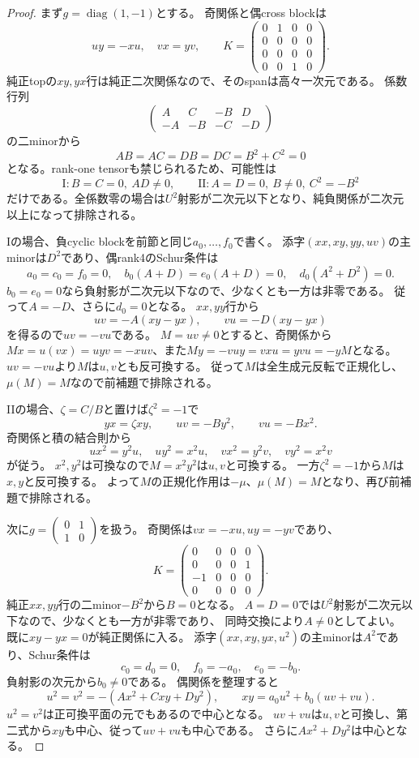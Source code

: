 \begin{proof}
まず$g=\operatorname{diag}(1,-1)$とする。
奇関係と偶cross blockは
\[
 uy=-xu,\quad vx=yv,\qquad
 K=\begin{pmatrix}0&1&0&0\\0&0&0&0\\0&0&0&0\\0&0&1&0\end{pmatrix}.
\]
純正topの$xy,yx$行は純正二次関係なので、そのspanは高々一次元である。
係数行列
\[
 \begin{pmatrix}A&C&-B&D\\-A&-B&-C&-D\end{pmatrix}
\]
の二minorから
\[
 AB=AC=DB=DC=B^2+C^2=0
\]
となる。rank-one tensorも禁じられるため、可能性は
\[
 \text{I}:B=C=0,\ AD\ne0,\qquad
 \text{II}:A=D=0,\ B\ne0,\ C^2=-B^2
\]
だけである。全係数零の場合は$U^2$射影が二次元以下となり、純負関係が二次元以上になって排除される。

Iの場合、負cyclic blockを前節と同じ$a_0,\ldots,f_0$で書く。
添字$(xx,xy,yy,uv)$の主minorは$D^2$であり、偶rank4のSchur条件は
\[
 a_0=c_0=f_0=0,\quad
 b_0(A+D)=e_0(A+D)=0,\quad d_0(A^2+D^2)=0.
\]
$b_0=e_0=0$なら負射影が二次元以下なので、少なくとも一方は非零である。
従って$A=-D$、さらに$d_0=0$となる。
$xx,yy$行から
\[
 uv=-A(xy-yx),\qquad vu=-D(xy-yx)
\]
を得るので$uv=-vu$である。
$M=uv\ne0$とすると、奇関係から
$Mx=u(vx)=uyv=-xuv$、また$My=-vuy=vxu=yvu=-yM$となる。
$uv=-vu$より$M$は$u,v$とも反可換する。
従って$M$は全生成元反転で正規化し、$\mu(M)=M$なので前補題で排除される。

IIの場合、$\zeta=C/B$と置けば$\zeta^2=-1$で
\[
 yx=\zeta xy,\qquad uv=-By^2,\qquad vu=-Bx^2.
\]
奇関係と積の結合則から
\[
 ux^2=y^2u,\quad uy^2=x^2u,\quad
 vx^2=y^2v,\quad vy^2=x^2v
\]
が従う。
$x^2,y^2$は可換なので$M=x^2y^2$は$u,v$と可換する。
一方$\zeta^2=-1$から$M$は$x,y$と反可換する。
よって$M$の正規化作用は$-\mu$、$\mu(M)=M$となり、再び前補題で排除される。

次に$g=\left(\begin{smallmatrix}0&1\\1&0\end{smallmatrix}\right)$を扱う。
奇関係は$vx=-xu,uy=-yv$であり、
\[
 K=\begin{pmatrix}0&0&0&0\\0&0&0&1\\-1&0&0&0\\0&0&0&0\end{pmatrix}.
\]
純正$xx,yy$行の二minor$-B^2$から$B=0$となる。
$A=D=0$では$U^2$射影が二次元以下なので、少なくとも一方が非零であり、
同時交換により$A\ne0$としてよい。
既に$xy-yx=0$が純正関係に入る。
添字$(xx,xy,yx,u^2)$の主minorは$A^2$であり、Schur条件は
\[
 c_0=d_0=0,\quad f_0=-a_0,\quad e_0=-b_0.
\]
負射影の次元から$b_0\ne0$である。
偶関係を整理すると
\[
 u^2=v^2=-(Ax^2+Cxy+Dy^2),\qquad
 xy=a_0u^2+b_0(uv+vu).
\]
$u^2=v^2$は正可換平面の元でもあるので中心となる。
$uv+vu$は$u,v$と可換し、第二式から$xy$も中心、従って$uv+vu$も中心である。
さらに$Ax^2+Dy^2$は中心となる。


\end{proof}

